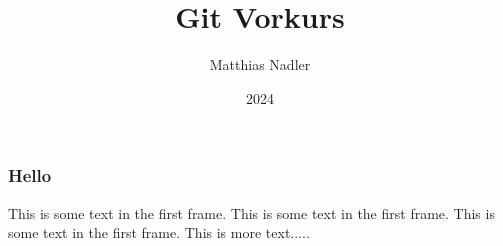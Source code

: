 \documentclass{beamer}
\title{Git Vorkurs}
\author{Matthias Nadler}
\institute{Uni Basel}
\date{2024}
\begin{document}
\frame{\titlepage}

\begin{frame}
\frametitle{Hello}
This is some text in the first frame. This is some text in the first frame. This is some text in the first frame.
This is more text.....
\end{frame}
\end{document}
